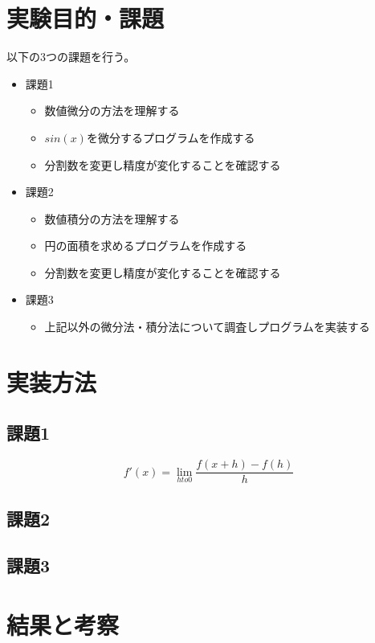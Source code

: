 \documentclass[dvipdfmx]{jsarticle}
\begin{document}
\section{実験目的・課題}
以下の3つの課題を行う。
\begin{itemize}
  \item 課題1
  \begin{itemize}
    \item 数値微分の方法を理解する
    \item $sin(x)$を微分するプログラムを作成する
    \item 分割数を変更し精度が変化することを確認する
  \end{itemize}
  \item 課題2
  \begin{itemize}
    \item 数値積分の方法を理解する
    \item 円の面積を求めるプログラムを作成する
    \item 分割数を変更し精度が変化することを確認する
  \end{itemize}
  \item 課題3
  \begin{itemize}
    \item 上記以外の微分法・積分法について調査しプログラムを実装する
  \end{itemize}
\end{itemize}

\section{実装方法}

\subsection{課題1}

\begin{equation}
  f'(x) = \lim_{h to 0} \frac{f(x+h)-f(h)}{h}
\end{equation}

\subsection{課題2}
\subsection{課題3}

\section{結果と考察}

\begin{thebibliography}{10}
  
  \url{}
\end{thebibliography}
\end{document}
